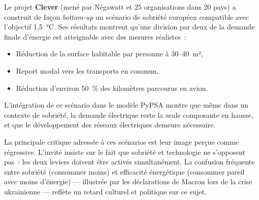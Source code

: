 Le projet \textbf{Clever} (mené par Négawatt et 25 organisations dans 20 pays) a construit de façon \textit{bottom-up} un scénario de sobriété européen compatible avec l'objectif 1,5~°C. Ses résultats montrent qu'une division par deux de la demande finale d'énergie est atteignable avec des mesures réalistes~:

\begin{itemize}
    \item Réduction de la surface habitable par personne à 30--40~m²,
    \item Report modal vers les transports en commun,
    \item Réduction d'environ 50~\% des kilomètres parcourus en avion.
\end{itemize}

L'intégration de ce scénario dans le modèle PyPSA montre que même dans un contexte de sobriété, la demande électrique reste la seule composante en hausse, et que le développement des réseaux électriques demeure nécessaire.

La principale critique adressée à ces scénarios est leur image perçue comme régressive. L'invité insiste sur le fait que sobriété et technologie ne s'opposent pas~: les deux leviers doivent être activés simultanément. La confusion fréquente entre sobriété (consommer moins) et efficacité énergétique (consommer pareil avec moins d'énergie) --- illustrée par les déclarations de Macron lors de la crise ukrainienne --- reflète un retard culturel et politique sur ce sujet.


